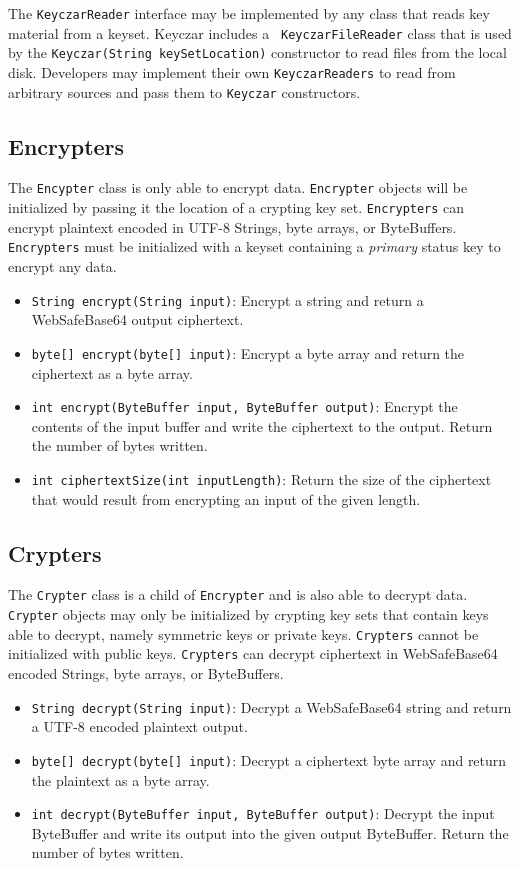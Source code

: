 \documentclass{llncs}
\begin{document}
The {\tt KeyczarReader} interface may be implemented by any class that
reads key material from a keyset. Keyczar includes a {\tt
  KeyczarFileReader} class that is used by the {\tt Keyczar(String
  keySetLocation)} constructor to read files from the local
disk. Developers may implement their own {\tt KeyczarReaders} to read
from arbitrary sources and pass them to {\tt Keyczar} constructors.

\subsection{Encrypters}

The {\tt Encypter} class is only able to encrypt data. {\tt Encrypter}
objects will be initialized by passing it the location of a crypting
key set.  {\tt Encrypters} can encrypt plaintext encoded in UTF-8
Strings, byte arrays, or ByteBuffers. {\tt Encrypters} must be
initialized with a keyset containing a {\it primary} status key to
encrypt any data.
\begin{itemize}
  \item {\tt String encrypt(String input)}: Encrypt a string and
    return a WebSafeBase64 output ciphertext.
  \item {\tt byte[] encrypt(byte[] input)}: Encrypt a byte array and
    return the ciphertext as a byte array.
  \item {\tt int encrypt(ByteBuffer input, ByteBuffer output)}:
    Encrypt the contents of the input buffer and write the ciphertext
    to the output. Return the number of bytes written.
  \item {\tt int ciphertextSize(int inputLength)}: Return the size of
    the ciphertext that would result from encrypting an input of the
    given length.
\end{itemize}

\subsection{Crypters}

The {\tt Crypter} class is a child of {\tt Encrypter} and is also able
to decrypt data. {\tt Crypter} objects may only be initialized by
crypting key sets that contain keys able to decrypt, namely symmetric
keys or private keys. {\tt Crypters} cannot be initialized with public
keys. {\tt Crypters} can decrypt ciphertext in WebSafeBase64 encoded
Strings, byte arrays, or ByteBuffers.


\begin{itemize}
  \item {\tt String decrypt(String input)}: Decrypt a WebSafeBase64
    string and return a UTF-8 encoded plaintext output.
  \item {\tt byte[] decrypt(byte[] input)}: Decrypt a ciphertext byte
    array and return the plaintext as a byte array.
  \item {\tt int decrypt(ByteBuffer input, ByteBuffer output)}:
    Decrypt the input ByteBuffer and write its output into the given
    output ByteBuffer.  Return the number of bytes written.
\end{itemize}
\end{document}
